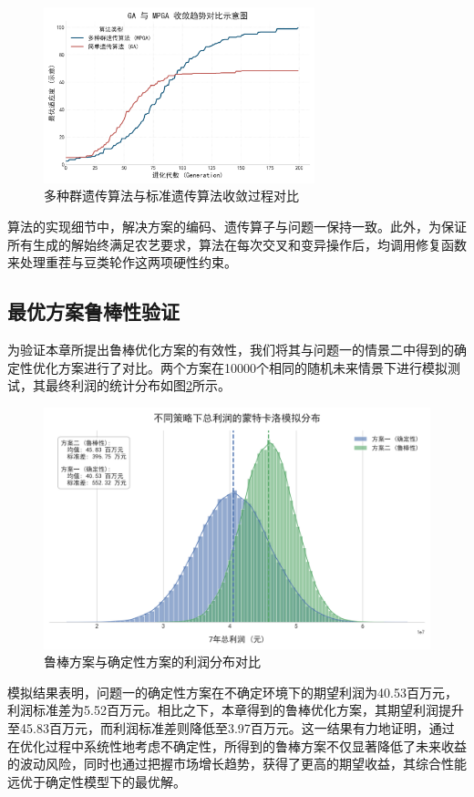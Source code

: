 \begin{figure}[H]
    \centering
    \includegraphics[width=0.7\textwidth]{figs/4问题二/遗传算法收敛对比图.png}

    \caption{多种群遗传算法与标准遗传算法收敛过程对比}
    \label{fig:convergence_comparison}
\end{figure}

算法的实现细节中，解决方案的编码、遗传算子与问题一保持一致。此外，为保证所有生成的解始终满足农艺要求，算法在每次交叉和变异操作后，均调用修复函数来处理重茬与豆类轮作这两项硬性约束。


\subsection{最优方案鲁棒性验证}


为验证本章所提出鲁棒优化方案的有效性，我们将其与问题一的情景二中得到的确定性优化方案进行了对比。两个方案在10000个相同的随机未来情景下进行模拟测试\cite{1024787004.nh}，其最终利润的统计分布如图\ref{fig:robustness_dist}所示。

\begin{figure}[H]
    \centering
    \includegraphics[width=\textwidth]{figs/4问题二/鲁棒性蒙德卡诺模拟分布图.png}
    \caption{鲁棒方案与确定性方案的利润分布对比}
    \label{fig:robustness_dist}
\end{figure}

模拟结果表明，问题一的确定性方案在不确定环境下的期望利润为40.53百万元，利润标准差为5.52百万元。相比之下，本章得到的鲁棒优化方案，其期望利润提升至45.83百万元，而利润标准差则降低至3.97百万元。这一结果有力地证明，通过在优化过程中系统性地考虑不确定性，所得到的鲁棒方案不仅显著降低了未来收益的波动风险，同时也通过把握市场增长趋势，获得了更高的期望收益，其综合性能远优于确定性模型下的最优解。


